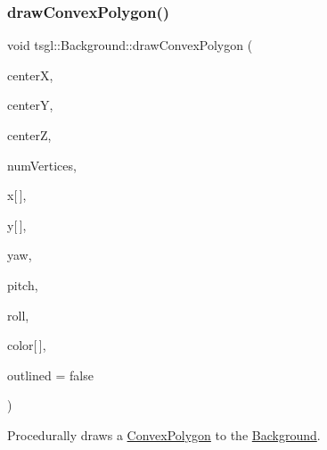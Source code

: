 \subsubsection{\texorpdfstring{draw\+Convex\+Polygon()}{drawConvexPolygon()}\hspace{0.1cm}{\footnotesize\ttfamily [2/2]}}
{\footnotesize\ttfamily void tsgl\+::\+Background\+::draw\+Convex\+Polygon (\begin{DoxyParamCaption}\item[{float}]{centerX,  }\item[{float}]{centerY,  }\item[{float}]{centerZ,  }\item[{int}]{num\+Vertices,  }\item[{float}]{x\mbox{[}$\,$\mbox{]},  }\item[{float}]{y\mbox{[}$\,$\mbox{]},  }\item[{float}]{yaw,  }\item[{float}]{pitch,  }\item[{float}]{roll,  }\item[{\hyperlink{structtsgl_1_1_color_float}{Color\+Float}}]{color\mbox{[}$\,$\mbox{]},  }\item[{bool}]{outlined = {\ttfamily false} }\end{DoxyParamCaption})\hspace{0.3cm}{\ttfamily [virtual]}}



Procedurally draws a \hyperlink{classtsgl_1_1_convex_polygon}{Convex\+Polygon} to the \hyperlink{classtsgl_1_1_background}{Background}. 


